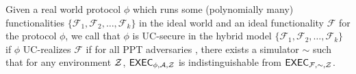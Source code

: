 \begin{definition}
Given a real world protocol $ \phi $ which runs some (polynomially many) functionalities $ \{\mathcal{F}_1, \mathcal{F}_2, \ldots, \mathcal{F}_k\} $ in the ideal world and an ideal functionality $ \mathcal{F} $ for the protocol $ \phi $, we call that $ \phi $ is UC-secure in the hybrid model $ \{\mathcal{F}_1, \mathcal{F}_2, \ldots, \mathcal{F}_k\} $ if $ \phi $ UC-realizes $ \mathcal{F} $ if for all PPT adversaries \adv, there exists a simulator $ \sim  $ such that for any environment $ \mathcal{Z} $,
 $\mathsf{EXEC}_{\phi, \mathcal{A}, \mathcal{Z}}$ is indistinguishable from $\mathsf{EXEC}_{\mathcal{F},\sim, \mathcal{Z}}$.
\end{definition}






\endinput



BROKEN BOLOW THIS




We fix $J \in \ecJ$ as a generator for public keys.  Any $\KeyGen$ algorithm randomly samples a secret keys $\sk \in \F_q$ and then computes its associate public keys $\pk = \sk J$.  We shall not discuss infrastructure that authorizes public keys.  Yet although our results do not require proof-of-knowledge on $\pk$ per se, we still strongly recommend that back certifications accompany any certificates that authorize $\pk$.

\smallskip




